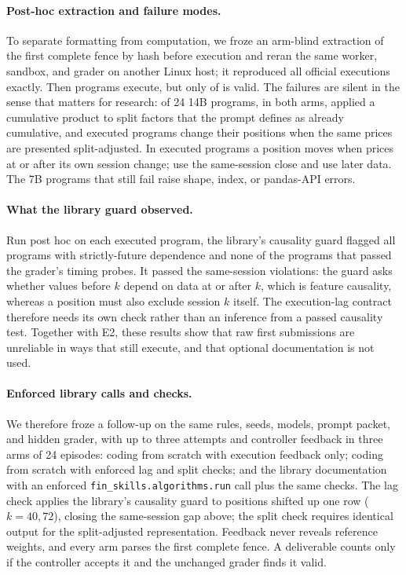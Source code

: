 \paragraph{Post-hoc extraction and failure modes.}
To separate formatting from computation, we froze an arm-blind extraction of the first
complete fence by hash before execution and reran the same worker, sandbox, and grader on
another Linux host; it reproduced all \CGEnvReproduced{} official executions exactly.
Then \CGPostExecuted{} programs execute, but only \CGPostValid{} of \CGPlanned{} is valid.
The failures are silent in the sense that matters for research: \CGRecumulated{} of 24 14B
programs, in both arms, applied a cumulative product to split factors that the prompt defines
as already cumulative, and \CGPostSplitFailures{} executed programs change their positions
when the same prices are presented split-adjusted. In \CGPostTimingFailures{} executed
programs a position moves when prices at or after its own session change; \CGSameSession{}
use the same-session close and \CGStrictlyFuture{} use later data. The 7B programs that still fail
raise shape, index, or pandas-API errors.

\paragraph{What the library guard observed.}
Run post hoc on each executed program, the library's causality guard flagged all
\CGGuardCaught{} programs with strictly-future dependence and none of the \CGTimingClean{}
programs that passed the grader's timing probes. It passed the \CGSameSessionGuardPassed{}
same-session violations: the guard asks whether values before $k$ depend on data at or after
$k$, which is feature causality, whereas a position must also exclude session $k$ itself.
The execution-lag contract therefore needs its own check rather than an inference from a
passed causality test. Together with E2, these results show that raw first submissions are
unreliable in ways that still execute, and that optional documentation is not used.

\paragraph{Enforced library calls and checks.}
We therefore froze a follow-up on the same rules, seeds, models, prompt packet, and hidden
grader, with up to three attempts and controller feedback in three arms of 24 episodes:
coding from scratch with execution feedback only; coding from scratch with enforced lag and
split checks; and the library documentation with an enforced
\texttt{fin\_skills.algorithms.run} call plus the same checks. The lag check applies the
library's causality guard to positions shifted up one row ($k=40,72$), closing the
same-session gap above; the split check requires identical output for the split-adjusted
representation. Feedback never reveals reference weights, and every arm parses the first
complete fence. A deliverable counts only if the controller accepts it and the unchanged
grader finds it valid.

